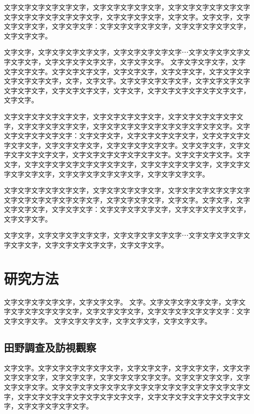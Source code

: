 \documentclass[12pt]{article}
\begin{document}
文字文字文字文字文字文字，文字文字文字文字文字，文字文字文字文字文字文字文字文字文字文字文字文字文字，文字文字文字文字，文字文字。文字文字，文字文字文字文字，文字文字文字：文字文字文字文字文字，文字文字文字文字文字，文字文字文字。

文字文字，文字文字文字文字文字，文字文字文字文字文字⋯文字文字文字文字文字文字文字，文字文字文字文字文字，文字文字文字。
文字文字文字文字，文字文字文字文字。文字文字文字文字，文字文字文字，文字文字文字，文字文字文字文字文字文字文字，文字，文字文字。文字文字文字文字文字，文字文字文字文字文字文字文字，文字文字文字文字，文字文字，文字文字文字文字文字文字文字，文字文字。

文字文字文字文字文字文字，文字文字文字文字文字，文字文字文字文字文字文字，文字文字文字文字文字，文字文字文字文字文字文字文字文字文字文字。文字文字文字文字文字文字：文字文字文字，文字文字文字文字文字，文字文字文字文字文字文字，文字文字文字文字，文字文字文字文字文字。文字文字文字，文字文字文字文字文字文字，文字文字文字文字文字文字文字。文字文字文字文字。文字文字，文字文字文字文字文字文字文字文字，文字文字文字文字文字，文字文字文字文字文字文字，文字文字文字文字文字文字，文字文字文字文字。

文字文字文字文字文字文字，文字文字文字文字文字，文字文字文字文字文字文字文字文字文字文字文字文字文字，文字文字文字文字，文字文字。文字文字，文字文字文字文字，文字文字文字：文字文字文字文字文字，文字文字文字文字文字，文字文字文字。

文字文字，文字文字文字文字文字，文字文字文字文字文字⋯文字文字文字文字文字文字文字，文字文字文字文字文字，文字文字文字。




\section{研究方法}

文字文字文字文字文字，文字文字文字。
文字。文字文字文字文字文字，文字文字文字文字文字文字文字，文字文字文字文字，文字文字文字文字文字文字：文字文字文字文字。
文字文字文字文字，文字文字文字，文字文字文字。

\subsection{田野調查及訪視觀察}
文字文字。文字文字文字文字文字文字，文字文字文字，文字文字文字，文字文字文字文字文字，文字文字文字，文字文字文字文字文字。文字文字文字文字，文字文字文字文字。文字文字文字文字文字文字文字文字文字文字文字文字文字文字文字，文字文字文字文字文字文字文字文字文字，文字文字文字文字文字文字文字文字，文字文字文字文字文字。
\end{document}
